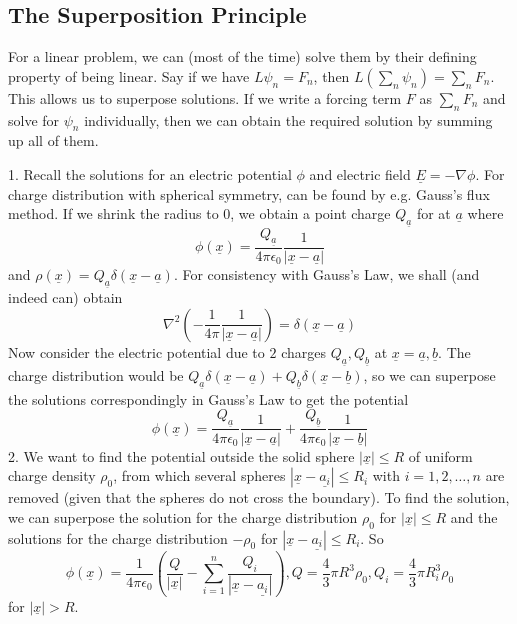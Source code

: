 \subsection{The Superposition Principle}
For a linear problem, we can (most of the time) solve them by their defining property of being linear.
Say if we have $L\psi_n=F_n$, then $L(\sum_n\psi_n)=\sum_nF_n$.
This allows us to superpose solutions.
If we write a forcing term $F$ as $\sum_nF_n$ and solve for $\psi_n$ individually, then we can obtain the required solution by summing up all of them.
\begin{example}
    1. Recall the solutions for an electric potential $\phi$ and electric field $\underline{E}=-\nabla\phi$.
    For charge distribution with spherical symmetry, can be found by e.g. Gauss's flux method.
    If we shrink the radius to $0$, we obtain a point charge $Q_{\underline{a}}$ for at $\underline{a}$ where
    $$\phi(\underline{x})=\frac{Q_{\underline{a}}}{4\pi\epsilon_0}\frac{1}{|\underline{x}-\underline{a}|}$$
    and $\rho(\underline{x})=Q_{\underline{a}}\delta(\underline{x}-\underline{a})$.
    For consistency with Gauss's Law, we shall (and indeed can) obtain
    $$\nabla^2\left( -\frac{1}{4\pi}\frac{1}{|\underline{x}-\underline{a}|} \right)=\delta(\underline{x}-\underline{a})$$
    Now consider the electric potential due to $2$ charges $Q_{\underline{a}},Q_{\underline{b}}$ at $\underline{x}=\underline{a},\underline{b}$.
    The charge distribution would be $Q_{\underline{a}}\delta(\underline{x}-\underline{a})+Q_{\underline{b}}\delta(\underline{x}-\underline{b})$, so we can superpose the solutions correspondingly in Gauss's Law to get the potential
    $$\phi(\underline{x})=\frac{Q_{\underline{a}}}{4\pi\epsilon_0}\frac{1}{|\underline{x}-\underline{a}|}+\frac{Q_{\underline{b}}}{4\pi\epsilon_0}\frac{1}{|\underline{x}-\underline{b}|}$$
    2. We want to find the potential outside the solid sphere $|\underline{x}|\le R$ of uniform charge density $\rho_0$, from which several spheres $|\underline{x}-\underline{a_i}|\le R_i$ with $i=1,2,\ldots,n$ are removed (given that the spheres do not cross the boundary).
    To find the solution, we can superpose the solution for the charge distribution $\rho_0$ for $|\underline{x}|\le R$ and the solutions for the charge distribution $-\rho_0$ for $|\underline{x}-\underline{a_i}|\le R_i$.
    So
    $$\phi(\underline{x})=\frac{1}{4\pi\epsilon_0}\left( \frac{Q}{|\underline{x}|}-\sum_{i=1}^n\frac{Q_i}{|\underline{x}-\underline{a_i}|} \right),Q=\frac{4}{3}\pi R^3\rho_0,Q_i=\frac{4}{3}\pi R_i^3\rho_0$$
    for $|\underline{x}|>R$.
\end{example}
